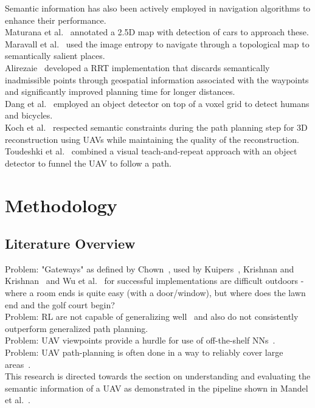 \documentclass[twocolumn,letterpaper]{IEEEAerospaceCLS}  %
\begin{document}
Semantic information has also been actively employed in navigation algorithms to enhance their performance.\\
Maturana et al.~\cite{maturana_looking_2017} annotated a 2.5D map with detection of cars to approach these.\\
Maravall et al.~\cite{maravall_navigation_2017} used the image entropy to navigate through a topological map to semantically salient places.\\ 
Alirezaie~\cite{alirezaie_exploiting_2017} developed a RRT implementation that discards semantically inadmissible points through geospatial information associated with the waypoints and significantly improved planning time for longer distances.\\
Dang et al.~\cite{dang_autonomous_2018} employed an object detector on top of a voxel grid to detect humans and bicycles.\\
Koch et al.~\cite{koch_automatic_2019} respected semantic constraints during the path planning step for 3D reconstruction using UAVs while maintaining the quality of the reconstruction.
Toudeshki et al.~\cite{toudeshki_robust_2018} combined a visual teach-and-repeat approach with an object detector to funnel the UAV to follow a path.

\section{Methodology} \label{sec:Met}
\subsection{Literature Overview}
Problem: "Gateways" as defined by Chown~\cite{chown_prototypes_1995}, used by Kuipers~\cite{kuipers_local_2004}, Krishnan and Krishnan~\cite{krishnan_visual_2010} and Wu et al.~\cite{wu_learning_2018} for successful implementations are difficult outdoors - where a room ends is quite easy (with a door/window), but where does the lawn end and the golf court begin?\\
Problem: RL are not capable of generalizing well~\cite{chaplot_object_2020} and also do not consistently outperform generalized path planning.\\
Problem: UAV viewpoints provide a hurdle for use of off-the-shelf NNs~\cite{richardwebster_psyphy:_2019}.\\
Problem: UAV path-planning is often done in a way to reliably cover large areas~\cite{vanegas_novel_2018}.\\
This research is directed towards the section on understanding and evaluating the semantic information of a UAV as demonstrated in the pipeline shown in Mandel et al.~\cite{mandel_towards_2020}.
\end{document}
